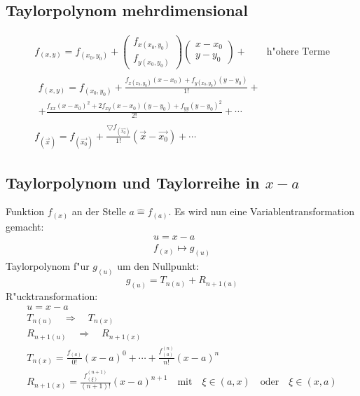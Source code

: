 \subsection{Taylorpolynom mehrdimensional}
\begin{gather}
  f_{(x,y)} = f_{(x_0,y_0)} +
	\begin{pmatrix}f_{x(x_0,y_0)} \\ f_{y(x_0,y_0)} \end{pmatrix}
	\begin{pmatrix}x-x_0 \\ y-y_0\end{pmatrix} + \qquad\text{h"ohere Terme} \\
\begin{split}
  f_{(x,y)} = f_{(x_0,y_0)} + \frac{f_{x(x_0,y_0)}(x-x_0)+f_{y(x_0,y_0)}(y-y_0)}{1!} + \\
	+ \frac{f_{xx}(x-x_0)^2 + 2f_{xy}(x-x_0)(y-y_0)+f_{yy}(y-y_0)^2}{2!} + \cdots
\end{split} \\
  f_{(\overrightarrow{x})} = f_{(\overrightarrow{x_0})}
	+ \frac{\bigtriangledown f_{(\overrightarrow{x_0})}}{1!}(\overrightarrow{x}-\overrightarrow{x_0})+\cdots
\end{gather}

\subsection{Taylorpolynom und Taylorreihe in $x-a$}
Funktion $f_{(x)}$ an der Stelle $a\hat{=}f_{(a)}$.
Es wird nun eine Variablentransformation gemacht:
\begin{gather}
  u = x-a \\
  f_{(x)} \longmapsto g_{(u)}
\end{gather}
Taylorpolynom f"ur $g_{(u)}$ um den Nullpunkt:
\begin{equation}
  g_{(u)} = T_{n(u)} + R_{n+1(u)}
\end{equation}
R"ucktransformation:
\begin{gather}
  u = x-a \\
  T_{n(u)} \quad\Longrightarrow\quad T_{n(x)} \\
  R_{n+1(u)} \quad\Longrightarrow\quad R_{n+1(x)} \\
  T_{n(x)} = \frac{f_{(a)}}{0!}(x-a)^0 + \cdots + \frac{f^{(n)}_{(a)}}{n!}(x-a)^n \\
  R_{n+1(x)} = \frac{f^{(n+1)}_{(\xi)}}{(n+1)!}(x-a)^{n+1} \quad\text{mit}\quad\xi\in (a,x)\quad\text{oder}\quad\xi\in (x,a)
\end{gather}


